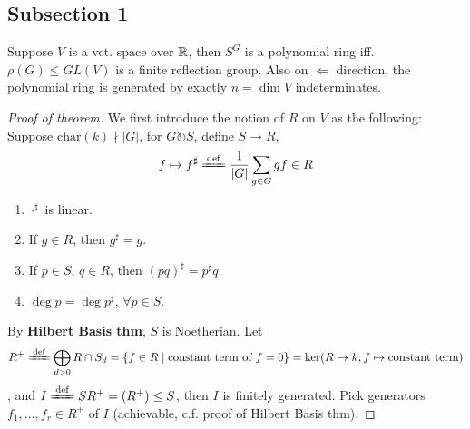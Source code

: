 \documentclass[UTF8, 12pt]{extarticle}
\begin{document}
    \subsection{Subsection 1}
    \lipsum[1]
    \begin{theorem}\label{big theorem on polynomial invariants}
        Suppose $V$ is a vct. space over $\mathbb{R}$, then $S^G$ is a polynomial ring iff. $\rho(G)\le GL(V)$ is a finite reflection group. Also on $\Leftarrow$ direction, the polynomial ring is generated by exactly $n = \dim V$ indeterminates.
    \end{theorem}
    \begin{proof}[Proof of theorem]
        We first introduce the notion of  $R$ on $V$ as the following:
        Suppose $\mathrm{char}(k)\nmid |G|$, for $G\circlearrowright S$, define $S\to R$, $$f\mapsto f^\sharp \ddef \frac{1}{|G|} \sum_{g\in G} gf\in R$$
            \begin{enumerate}
                \item $\cdot^\sharp$ is linear.
                \item If $g\in R$, then $g^\sharp = g$.
                \item If $p\in S$, $q\in R$, then $(pq)^\sharp = p^\sharp q$.
                \item $\deg p = \deg p^\sharp$, $\forall p\in S$.
            \end{enumerate}
        By \textbf{\color{allanblue}Hilbert Basis thm}, $S$ is Noetherian. Let $$R^+ \ddef \bigoplus_{d > 0} R\cap S_d = \{f\in R \mid \text{constant term of $f = 0$}\} = \ker(R\to k, f\mapsto \text{constant term})$$, and $I\ddef SR^+ = (R^+) \le S$, then $I$ is finitely generated. Pick generators $f_1, \dots, f_r\in R^+$ of $I$ (achievable, c.f. proof of Hilbert Basis thm).


\end{proof}
\end{document}
